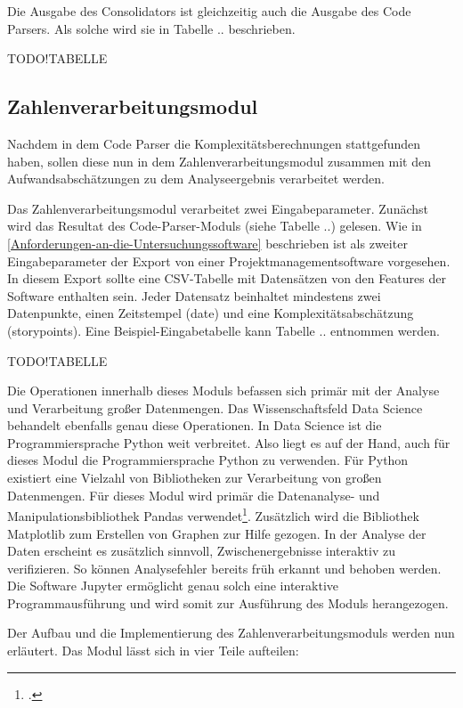 Die Ausgabe des Consolidators ist gleichzeitig auch die Ausgabe des Code
Parsers. Als solche wird sie in Tabelle .. beschrieben.

TODO!TABELLE

\subsection{Zahlenverarbeitungsmodul}\label{Zahlenverarbeitungsmodul}

Nachdem in dem Code Parser die Komplexitätsberechnungen stattgefunden
haben, sollen diese nun in dem Zahlenverarbeitungsmodul zusammen mit den
Aufwandsabschätzungen zu dem Analyseergebnis verarbeitet werden.

Das Zahlenverarbeitungsmodul verarbeitet zwei Eingabeparameter. Zunächst
wird das Resultat des Code-Parser-Moduls (siehe Tabelle ..) gelesen. Wie
in \ref{Anforderungen-an-die-Untersuchungssoftware} beschrieben ist als zweiter Eingabeparameter der Export von
einer Projektmanagementsoftware vorgesehen. In diesem Export sollte eine
CSV-Tabelle mit Datensätzen von den Features der Software enthalten
sein. Jeder Datensatz beinhaltet mindestens zwei Datenpunkte, einen
Zeitstempel (date) und eine Komplexitätsabschätzung (storypoints). Eine
Beispiel-Eingabetabelle kann Tabelle .. entnommen werden.

TODO!TABELLE

Die Operationen innerhalb dieses Moduls befassen sich primär mit der
Analyse und Verarbeitung gro\ss er Datenmengen. Das Wissenschaftsfeld Data
Science behandelt ebenfalls genau diese Operationen. In Data Science ist
die Programmiersprache Python weit verbreitet.
Also liegt es auf der Hand, auch für dieses Modul die Programmiersprache
Python zu verwenden. Für Python existiert eine Vielzahl von Bibliotheken
zur Verarbeitung von gro\ss en Datenmengen. Für dieses Modul wird primär
die Datenanalyse- und Manipulationsbibliothek Pandas
verwendet\footcite[Vgl. ][]{PandasPythonData2022}. Zusätzlich wird
die Bibliothek Matplotlib zum Erstellen von Graphen zur Hilfe gezogen.
In der Analyse der Daten erscheint es zusätzlich sinnvoll,
Zwischenergebnisse interaktiv zu verifizieren. So können Analysefehler
bereits früh erkannt und behoben werden. Die Software Jupyter ermöglicht
genau solch eine interaktive Programmausführung und wird somit zur
Ausführung des Moduls herangezogen.

Der Aufbau und die Implementierung des Zahlenverarbeitungsmoduls werden
nun erläutert. Das Modul lässt sich in vier Teile aufteilen:

